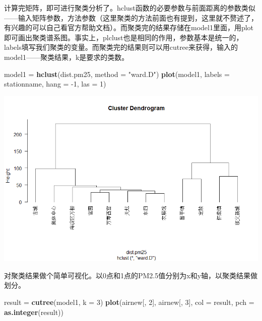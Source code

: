 \documentclass[]{ctexbook}
\newenvironment{Shaded}{\begin{snugshade}}{\end{snugshade}}
\newcommand{\DataTypeTok}[1]{\textcolor[rgb]{0.13,0.29,0.53}{#1}}
\newcommand{\DecValTok}[1]{\textcolor[rgb]{0.00,0.00,0.81}{#1}}
\newcommand{\KeywordTok}[1]{\textcolor[rgb]{0.13,0.29,0.53}{\textbf{#1}}}
\newcommand{\NormalTok}[1]{#1}
\newcommand{\StringTok}[1]{\textcolor[rgb]{0.31,0.60,0.02}{#1}}
\begin{document}
计算完矩阵，即可进行聚类分析了。hclust函数的必要参数与前面距离的参数类似------输入矩阵参数，方法参数（这里聚类的方法前面也有提到，这里就不赘述了，有兴趣的可以自己看官方帮助文档）。而聚类完的结果存储在model1里面，用plot即可画出聚类谱系图。事实上，plclust也是相同的作用，参数基本是统一的，labels填写我们聚类的变量。而聚类完的结果则可以用cutree来获得，输入的model1------聚类结果，k是要求的类数。

\begin{Shaded}
\begin{Highlighting}[]
\NormalTok{model1 =}\StringTok{ }\KeywordTok{hclust}\NormalTok{(dist.pm25, }\DataTypeTok{method =} \StringTok{"ward.D"}\NormalTok{)}
\KeywordTok{plot}\NormalTok{(model1, }\DataTypeTok{labels =}\NormalTok{ stationname, }\DataTypeTok{hang =} \DecValTok{-1}\NormalTok{, }\DataTypeTok{las =} \DecValTok{1}\NormalTok{)}
\end{Highlighting}
\end{Shaded}

\includegraphics[width=1\linewidth,height=0.4\textheight]{fig/fig27}

对聚类结果做个简单可视化。以0点和1点的PM2.5值分别为x和y轴，以聚类结果做划分。

\begin{Shaded}
\begin{Highlighting}[]
\NormalTok{result =}\StringTok{ }\KeywordTok{cutree}\NormalTok{(model1, }\DataTypeTok{k =} \DecValTok{3}\NormalTok{)}
\KeywordTok{plot}\NormalTok{(airnew[, }\DecValTok{2}\NormalTok{], airnew[, }\DecValTok{3}\NormalTok{], }\DataTypeTok{col =}\NormalTok{ result, }\DataTypeTok{pch =} \KeywordTok{as.integer}\NormalTok{(result))}
\end{Highlighting}
\end{Shaded}
\end{document}
